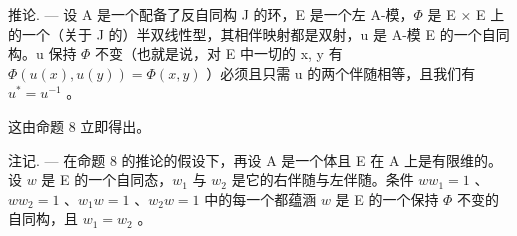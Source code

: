 推论. --- 设 A 是一个配备了反自同构 J 的环，E 是一个左 A-模，\(\Phi\) 是 E × E 上的一个（关于 J 的）半双线性型，其相伴映射都是双射，u 是 A-模 E 的一个自同构。u 保持 \(\Phi\) 不变（也就是说，对 E 中一切的 x, y 有 \(\Phi(u(x), u(y)) = \Phi(x, y)\) ）必须且只需 u 的两个伴随相等，且我们有 \(u^{*} = u^{-1}\) 。

这由命题 8 立即得出。

注记. --- 在命题 8 的推论的假设下，再设 A 是一个体且 E 在 A 上是有限维的。设 \(w\) 是 E 的一个自同态，\(w_{1}\) 与 \(w_{2}\) 是它的右伴随与左伴随。条件 \(ww_{1}=1\) 、\(ww_{2}=1\) 、\(w_{1}w=1\) 、\(w_{2}w=1\) 中的每一个都蕴涵 \(w\) 是 E 的一个保持 \(\Phi\) 不变的自同构，且 \(w_{1}=w_{2}\) 。

